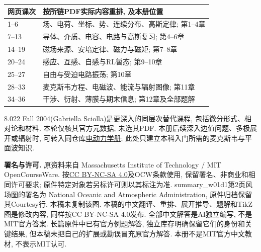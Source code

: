\begin{center}
\begin{tabular}{p{.17\linewidth}p{.74\linewidth}}
\toprule
网页课次 & 按所链PDF实际内容重排, 及本册位置\\\midrule
1--6 & 场、电荷、坐标、势、连续分布、高斯定律; 第1--4章\\
7--13 & 导体、介质、电容、电路与高斯复习; 第4--6章\\
14--19 & 磁场来源、安培定律、磁力与磁矩; 第7--8章\\
20--24 & 感应、互感、自感与RL暂态; 第9--10章\\
25--27 & 自由与受迫电路振荡; 第10章\\
28--33 & 麦克斯韦方程、电磁波、能流与辐射图像; 第11章\\
34--36 & 干涉、衍射、薄膜与期末信息; 第12章及全部题解\\\bottomrule
\end{tabular}
\end{center}

8.022 Fall 2004(Gabriella Sciolla)是更深入的同层次替代课程, 包括微分形式、相对论和材料. 本轮仅核其官方元数据, 未选其PDF. 本册后续深入边值问题、多极展开或辐射时, 可转入同仓库\href{https://github.com/xhc144/mit-ocw-notes/tree/main/subjects/electrodynamics}{电动力学册}; 此处只建立本科入门所需的麦克斯韦与平面波知识.

\noindent\textbf{署名与许可.} 原资料来自 Massachusetts Institute of Technology / MIT OpenCourseWare. 按\href{https://creativecommons.org/licenses/by-nc-sa/4.0/}{CC BY-NC-SA 4.0}及OCW条款使用, 保留署名、非商业和相同许可要求; 原件特定对象若另标许可则以其标注为准. summary\_w01d1第2页风场图的署名为 National Oceanic and Atmospheric Administration, 原件归档保留其Courtesy行, 本稿未复制该图. 本稿的中文翻译、重排、展开推导、题解和TikZ图是修改内容, 同样按CC BY-NC-SA 4.0发布. 全部中文解答是AI独立编写, 不是MIT官方答案. 长篇原件中已有官方例题解答, 独立库存明确保留它们的身份和关键结果, 但本稿未把自己的扩展或勘误冒充原官方解答. 本册不是MIT官方中文教材, 不表示MIT认可.
